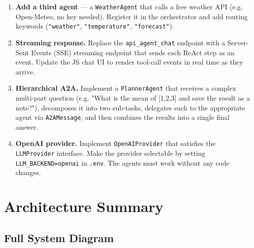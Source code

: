 \documentclass[11pt,a4paper]{article}
\begin{document}
\begin{enumerate}[leftmargin=*, label=\textbf{A\arabic*.}]
  \item \textbf{Add a third agent} — a \texttt{WeatherAgent} that calls
        a free weather API (e.g. Open-Meteo, no key needed).
        Register it in the orchestrator and add routing keywords
        (\texttt{"weather"}, \texttt{"temperature"}, \texttt{"forecast"}).

  \item \textbf{Streaming response.} Replace the \texttt{api\_agent\_chat}
        endpoint with a Server-Sent Events (SSE) streaming endpoint that
        sends each ReAct step as an event. Update the JS chat UI to render
        tool-call events in real time as they arrive.

  \item \textbf{Hierarchical A2A.} Implement a \texttt{PlannerAgent} that
        receives a complex multi-part question (e.g. "What is the mean of
        [1,2,3] and save the result as a note?"), decomposes it into two
        sub-tasks, delegates each to the appropriate agent via \texttt{A2AMessage},
        and then combines the results into a single final answer.

  \item \textbf{OpenAI provider.} Implement \texttt{OpenAIProvider} that
        satisfies the \texttt{LLMProvider} interface. Make the provider
        selectable by setting \texttt{LLM\_BACKEND=openai} in \texttt{.env}.
        The agents must work without any code changes.
\end{enumerate}

\newpage
\section{Architecture Summary}

\subsection{Full System Diagram}
\end{document}
